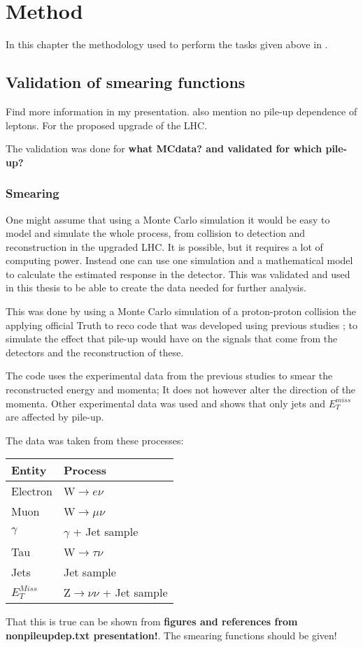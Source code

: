\chapter{Method}\label{cha:meth}
In this chapter the methodology used to perform the tasks given above in .
\newpage
\section{Validation of smearing functions} 


Find more information in my presentation. also mention no pile-up dependence of leptons.
For the proposed upgrade of the LHC.

The validation was done for \textbf{what MCdata? and validated for which pile-up?}

\subsection{Smearing}\label{sec:vali:subsec:smear}
One might assume that using a Monte Carlo simulation it would be easy to model and simulate the whole process, from collision to detection and reconstruction in the upgraded LHC. It is possible, but it requires a lot of computing power. Instead one can use one simulation and a mathematical model to calculate the estimated response in the detector. This was validated and used in this thesis to be able to create the data needed for further analysis. 

This was done by using a Monte Carlo simulation of a proton-proton collision the applying official Truth to reco code that was developed using previous studies \citep{ATL-PHYS-PUB-2013-004}; to simulate the effect that pile-up would have on the signals that come from the detectors and the reconstruction of these.

The code uses the experimental data from the previous studies to smear the reconstructed energy and momenta; It does not however alter the direction of the momenta. Other experimental data was used and shows that only jets and $E^{miss}_T$ are affected by pile-up. 

The data was taken from these processes:
\begin{table}[h]
\begin{center}
\begin{tabular}{|l|l|}
\hline
Entity & Process \\ \hline
Electron & W$\rightarrow e\nu$ \\
Muon & W$\rightarrow \mu \nu$ \\
$\gamma$ & $\gamma$ + Jet sample \\
Tau & W$\rightarrow \tau \nu$ \\
Jets & Jet sample \\
$E_T^{Miss}$ & Z$\rightarrow \nu \nu$ + Jet sample \\ \hline
\end{tabular}
\end{center}
\end{table}
That this is true can be shown from \textbf{figures and references from nonpileupdep.txt presentation!}. The smearing functions should be given!

